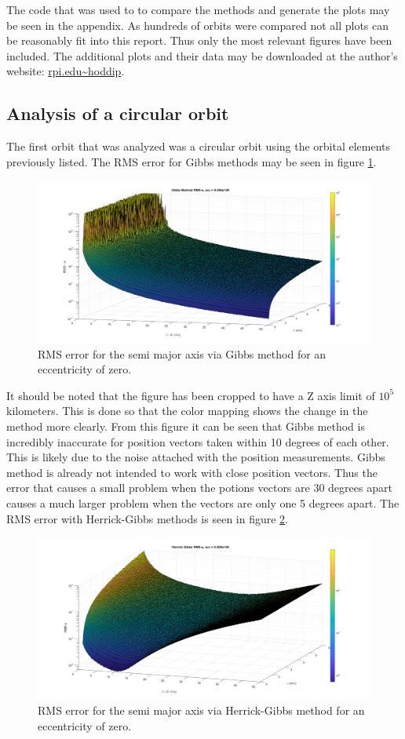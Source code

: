 \documentclass[12pt]{article}
\begin{document}
	The code that was used to to compare the methods and generate the plots may be seen in the appendix. As hundreds of orbits were compared not all plots can be reasonably fit into this report. Thus only the most relevant figures have been included. The additional plots and their data may be downloaded at the author's website: \url{rpi.edu\~hoddip}.
	\subsection{Analysis of a circular orbit}
	The first orbit that was analyzed was a circular orbit using the orbital elements previously listed. The RMS error for Gibbs methods may be seen in figure \ref{fig:circulargibbs}.
	\begin{figure}[H]
		\centering
		\includegraphics[width=0.7\linewidth]{circularGibbs}
		\caption{RMS error for the semi major axis via Gibbs method for an eccentricity of zero.}
		\label{fig:circulargibbs}
	\end{figure}
		It should be noted that the figure has been cropped to have a Z axis limit of $10^5$ kilometers. This is done so that the color mapping shows the change in the method more clearly. From this figure it can be seen that Gibbs method is incredibly inaccurate for position vectors taken within 10 degrees of each other. This is likely due to the noise attached with the position measurements. Gibbs method is already not intended to work with close position vectors. Thus the error that causes a small problem when the potions vectors are 30 degrees apart causes a much larger problem when the vectors are only one 5 degrees apart. The RMS error with Herrick-Gibbs methods is seen in figure \ref{fig:circularherrickgibbs}.
		
	\begin{figure}[H]
		\centering
		\includegraphics[width=0.7\linewidth]{circularHerrickGibbs}
		\caption{RMS error for the semi major axis via Herrick-Gibbs method for an eccentricity of zero.}
		\label{fig:circularherrickgibbs}
	\end{figure}
	
\end{document}
